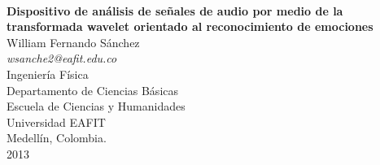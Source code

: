 \documentclass[11pt,lettersize]{article} %
\begin{document}
%
%
%
%




\thispagestyle{empty} %
\begin{center}
\textbf{\\[1.5cm]{\LARGE Dispositivo de análisis de señales de audio por medio de la transformada wavelet orientado al reconocimiento de emociones}}\\[5cm]
{\Large William Fernando S\'anchez} \\ {\large \textit{wsanche2@eafit.edu.co}}\\[7.5cm]
Ingenier\'ia F\'isica \\ Departamento de Ciencias Básicas \\ Escuela de Ciencias y Humanidades \\ Universidad EAFIT \\ Medell\'in, Colombia.\\
2013
\end{center}
\pagebreak
\end{document}
